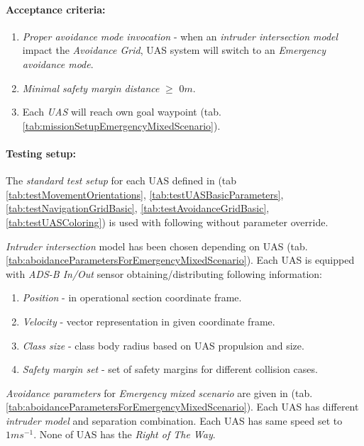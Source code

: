     \noindent \paragraph{Acceptance criteria:}
    \begin{enumerate}
        \item \emph{Proper avoidance mode invocation} - when an  \emph{intruder intersection model} impact the \emph{Avoidance Grid}, UAS system will switch to an \emph{Emergency avoidance mode}.
        
        \item\emph{Minimal safety margin distance} $\ge$ $0 m$.
        
        \item Each \emph{UAS} will reach own goal waypoint (tab. \ref{tab:missionSetupEmergencyMixedScenario}).
    \end{enumerate}
    
    
    \noindent\paragraph{Testing setup:} The \emph{standard test setup} for each UAS defined in (tab \ref{tab:testMovementOrientations}, \ref{tab:testUASBasicParameters}, \ref{tab:testNavigationGridBasic}, \ref{tab:testAvoidanceGridBasic}, \ref{tab:testUASColoring}) is used with following without parameter override.

    \emph{Intruder intersection} model has been chosen depending on UAS (tab. \ref{tab:aboidanceParametersForEmergencyMixedScenario}). Each UAS is equipped with \emph{ADS-B In/Out} sensor obtaining/distributing following information:
    \begin{enumerate}
        \item \emph{Position} - in operational section coordinate frame.
        \item \emph{Velocity} - vector representation in given coordinate frame.
        \item \emph{Class size} - class body radius based on UAS propulsion and size.
        \item \emph{Safety margin set} - set of safety margins for different collision cases.
    \end{enumerate}
    
    \emph{Avoidance parameters} for \emph{Emergency mixed scenario} are given in (tab. \ref{tab:aboidanceParametersForEmergencyMixedScenario}). Each UAS has different \emph{intruder model} and separation combination. Each UAS has same speed set to $1 m s^{-1}$. None of UAS has the \emph{Right of The Way}. 
    

